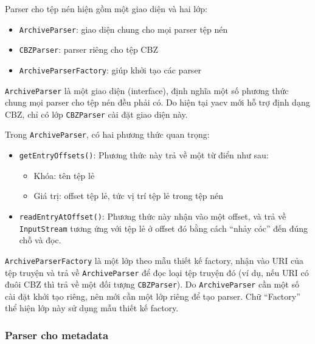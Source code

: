 \documentclass[../../../../thesis]{subfiles}
\begin{document}
Parser cho tệp nén hiện gồm một giao diện và hai lớp:

\begin{itemize}
    \item
        \texttt{ArchiveParser}: giao diện chung cho mọi parser tệp nén
    \item
        \texttt{CBZParser}: parser riêng cho tệp CBZ
    \item
        \texttt{ArchiveParserFactory}: giúp khởi tạo các parser
\end{itemize}

\texttt{ArchiveParser} là một giao diện (interface), định nghĩa một số phương
thức chung mọi parser cho tệp nén đều phải có. Do hiện tại yacv mới hỗ trợ định
dạng CBZ, chỉ có lớp \texttt{CBZParser} cài đặt giao diện này.

Trong \texttt{ArchiveParser}, có hai phương thức quan trọng:

\begin{itemize}
    \item
        \texttt{getEntryOffsets()}: Phương thức này trả về một từ điển như sau:

        \begin{itemize}
            \item
                Khóa: tên tệp lẻ
            \item
                Giá trị: offset tệp lẻ, tức vị trí tệp lẻ trong tệp nén
        \end{itemize}
    \item
        \texttt{readEntryAtOffset()}: Phương thức này nhận vào một offset, và
        trả về \texttt{InputStream} tương ứng với tệp lẻ ở offset đó bằng cách
        ``nhảy cóc'' đến đúng chỗ và đọc.
\end{itemize}

\texttt{ArchiveParserFactory} là một lớp theo mẫu thiết kế factory, nhận
vào URI của tệp truyện và trả về \texttt{ArchiveParser} để đọc loại tệp truyện
đó (ví dụ, nếu URI có đuôi CBZ thì trả về một đối tượng \texttt{CBZParser}). Do
\texttt{ArchiveParser} cần một số cài đặt khởi tạo riêng, nên mới cần một lớp
riêng để tạo parser. Chữ ``Factory'' thể hiện lớp này sử dụng mẫu thiết kế
factory.



\subsubsection{Parser cho metadata}
\end{document}

